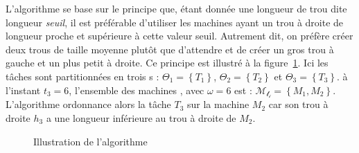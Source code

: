 \documentclass[a4paper,9pt]{article}
\begin{document}
L'algorithme se base sur le principe que, étant donnée une longueur de trou dite longueur
\emph{seuil}, il est préférable d'utiliser les machines ayant un trou à droite de longueur proche et
supérieure à cette valeur seuil. Autrement dit, on préfère créer deux trous de taille moyenne plutôt
que d'attendre et de créer un gros trou à gauche et un plus petit à droite. Ce principe est
illustré à la figure~\ref{fig:principeordo}. Ici les tâches sont partitionnées en trois
\tphase{}s : $\Theta_1 = \left\{ T_1 \right\}$, $\Theta_2 = \left\{ T_2 \right\}$ et $\Theta_3 =
\left\{ T_3 \right\}$. à l'instant $t_3 = 6$, l'ensemble des machines
, avec $\omega = 6$ est :  $\mathcal{M_{t_i}} = \left\{ M_1, M_2
\right\}$. L'algorithme ordonnance alors la tâche $T_3$ sur la machine $M_2$ car son trou à droite
$h_3$ a une longueur inférieure au trou à droite de $M_2$.

\begin{figure}
    \centering
    \begin{minipage}[t]{6.5cm}
        \begin{ordo}[5.2]{2}{2}{12}



        \end{ordo}
        \label{fig:ordo_phase}
    \end{minipage}
    \hfill
    \begin{minipage}[t]{6.5cm}
        \begin{ordo}[5.2]{2}{2}{12}



        \end{ordo}
        \label{fig:ordo_choix}
    \end{minipage}
    \caption{Illustration de l'algorithme}
    \label{fig:principeordo}
\end{figure}
\end{document}
